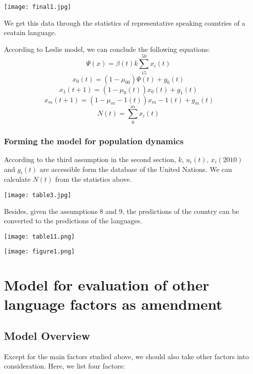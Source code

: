 \documentclass{mcmthesis}
\begin{document}
\texttt{[image: final1.jpg]}

We get this data through the statistics of representative speaking countries of a ceatain language.

According to Leslie model, we can conclude the following equations:
\begin{equation}
  \Psi(x) = \beta(t) k \sum_{15}^{50} x_i(t)
\end{equation}
\begin{equation}
  x_0(t)= (1-\mu_{00})\Psi(t)+g_0(t)
\end{equation}
\begin{equation}
  x_1(t+1)=(1-\mu_0(t))x_0(t)+g_1(t)
\end{equation}
\begin{equation}\
  x_m(t+1)=(1-\mu_m-1(t))x_m-1(t)+g_m(t)
\end{equation}
\begin{equation}
  N(t)=\sum_{0}^{m} x_i(t)
\end{equation}
\subsubsection{Forming the model for population dynamics}
According to the third assumption in the second section, $k$, $u_i(t)$, $x_i(2010)$ and  $g_i(t)$ are accessible form the database of the United Nations. We can calculate $N(t)$ from the statistics above.



\texttt{[image: table3.jpg]}

Besides, given the assumptions 8 and 9, the predictions of the country can be converted to the predictions of the languages.


\texttt{[image: table11.png]}



\texttt{[image: figure1.png]}



\section{Model for evaluation of other language factors as amendment}

\subsection{Model Overview}



Except for the main factors studied above, we should also take other factors into consideration. Here, we list four factors:
\end{document}
